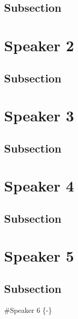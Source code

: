 \documentclass[
]{book}
\begin{document}
\hypertarget{subsection}{%
\section{Subsection}\label{subsection}}

\hypertarget{speaker-2}{%
\chapter*{Speaker 2}\label{speaker-2}}

\hypertarget{subsection}{%
\section{Subsection}\label{subsection}}

\hypertarget{speaker-3}{%
\chapter*{Speaker 3}\label{speaker-3}}

\hypertarget{subsection}{%
\section{Subsection}\label{subsection}}

\hypertarget{speaker-4}{%
\chapter*{Speaker 4}\label{speaker-4}}

\hypertarget{subsection}{%
\section{Subsection}\label{subsection}}

\hypertarget{speaker-5}{%
\chapter*{Speaker 5}\label{speaker-5}}

\hypertarget{subsection}{%
\section{Subsection}\label{subsection}}

\#Speaker 6 \{-\}
\end{document}
